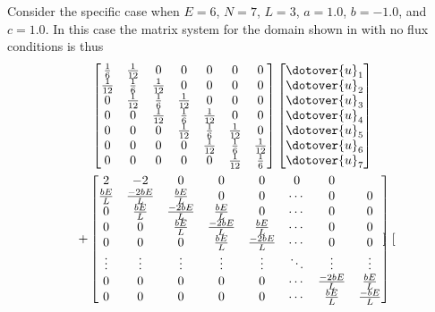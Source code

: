 Consider the specific case when $E=6$, $N=7$, $L=3$, $a=1.0$,
$b=-1.0$, and $c=1.0$. In this case the matrix system for the domain
shown in  with no flux conditions is thus
\begin{multline}
  \begin{bmatrix}
    \frac{1}{6} & \frac{1}{12} & 0 & 0 & 0 & 0 & 0 \\
    \frac{1}{12} & \frac{1}{6} & \frac{1}{12} & 0 & 0 & 0 & 0 \\
    0 & \frac{1}{12} & \frac{1}{6} & \frac{1}{12} & 0 & 0 & 0 \\
    0 & 0 & \frac{1}{12} & \frac{1}{6} & \frac{1}{12} & 0 & 0 \\
    0 & 0 & 0 & \frac{1}{12} & \frac{1}{6} & \frac{1}{12} & 0 \\
    0 & 0 & 0 & 0 & \frac{1}{12} & \frac{1}{6} & \frac{1}{12} \\
    0 & 0 & 0 & 0 & 0 & \frac{1}{12} & \frac{1}{6}
  \end{bmatrix} \begin{bmatrix}
    \dotover{u}_{1} \\
    \dotover{u}_{2} \\
    \dotover{u}_{3} \\
    \dotover{u}_{4} \\
    \dotover{u}_{5} \\
    \dotover{u}_{6} \\
    \dotover{u}_{7} \\
  \end{bmatrix} \\
  + \begin{bmatrix}
    2 & -2 & 0 & 0 & 0 & 0 & 0 \\
    \frac{bE}{L} & \frac{-2bE}{L} &  \frac{bE}{L} & 0 & 0 & \cdots & 0 & 0 \\
    0 & \frac{bE}{L} & \frac{-2bE}{L} &  \frac{bE}{L} & 0 & \cdots & 0 & 0 \\
    0 & 0 & \frac{bE}{L} & \frac{-2bE}{L} &  \frac{bE}{L} & \cdots & 0 & 0 \\
    0 & 0 & 0 & \frac{bE}{L} & \frac{-2bE}{L} & \cdots & 0 & 0 \\
    \vdots & \vdots & \vdots & \vdots & \vdots & \ddots & \vdots & \vdots \\
    0 & 0 & 0 & 0 & 0 & \cdots & \frac{-2bE}{L} & \frac{bE}{L} \\
    0 & 0 & 0 & 0 & 0 & \cdots & \frac{bE}{L} & \frac{-bE}{L} \\
  \end{bmatrix} \begin{bmatrix}

\end{bmatrix}
\end{multline}
